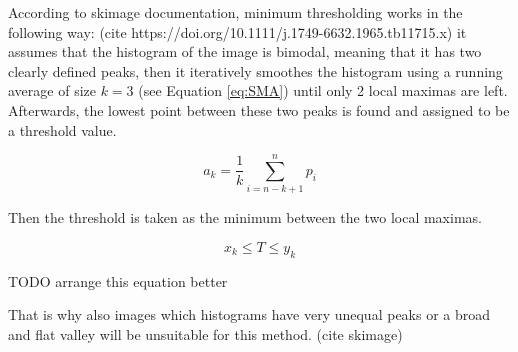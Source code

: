 According to skimage documentation, minimum thresholding works in the following way: (cite  https://doi.org/10.1111/j.1749-6632.1965.tb11715.x) it assumes that the histogram of the image is bimodal, meaning that it has two clearly defined peaks, then it iteratively smoothes the histogram using a running average of size $k=3$ (see Equation \ref{eq:SMA}) until only 2 local maximas are left. Afterwards, the lowest point between these two peaks is found and assigned to be a threshold value.

\begin{equation}
    a_k = \frac{1}{k}\sum_{i=n-k + 1}^{n}p_i
\label{eq:SMA}
\end{equation}

Then the threshold is taken as the minimum between the two local maximas.

\begin{equation}
    x_k \leq T \leq y_k
\end{equation}

TODO arrange this equation better

That is why also images which histograms have very unequal peaks or a broad and flat valley will be unsuitable for this method. (cite skimage)

